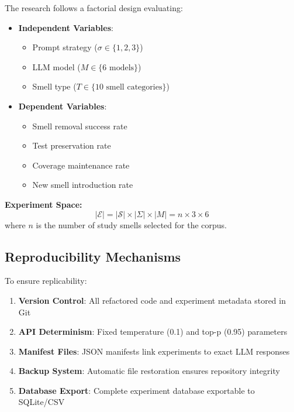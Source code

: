 \documentclass[12pt]{article}
\begin{document}
The research follows a factorial design evaluating:
\begin{itemize}
    \item \textbf{Independent Variables}: 
        \begin{itemize}
            \item Prompt strategy ($\sigma \in \{1, 2, 3\}$)
            \item LLM model ($M \in \{\text{6 models}\}$)
            \item Smell type ($T \in \{\text{10 smell categories}\}$)
        \end{itemize}
    \item \textbf{Dependent Variables}:
        \begin{itemize}
            \item Smell removal success rate
            \item Test preservation rate
            \item Coverage maintenance rate
            \item New smell introduction rate
        \end{itemize}
\end{itemize}

\textbf{Experiment Space:}
\begin{equation}
    |\mathcal{E}| = |\mathcal{S}| \times |\Sigma| \times |M| = n \times 3 \times 6
\end{equation}
where $n$ is the number of study smells selected for the corpus.

\subsection{Reproducibility Mechanisms}

To ensure replicability:
\begin{enumerate}
    \item \textbf{Version Control}: All refactored code and experiment metadata stored in Git
    \item \textbf{API Determinism}: Fixed temperature (0.1) and top-p (0.95) parameters
    \item \textbf{Manifest Files}: JSON manifests link experiments to exact LLM responses
    \item \textbf{Backup System}: Automatic file restoration ensures repository integrity
    \item \textbf{Database Export}: Complete experiment database exportable to SQLite/CSV
\end{enumerate}
\end{document}
